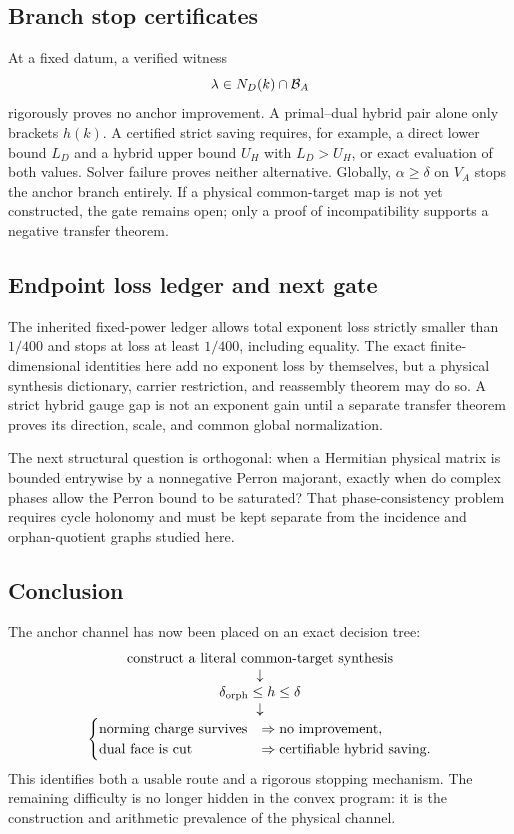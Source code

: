 \subsection*{Branch stop certificates}

At a fixed datum, a verified witness
\[
 \lambda\in N_D(k)\cap\mathcal B_A
\]
rigorously proves no anchor improvement.  A primal--dual hybrid pair
alone only brackets \(h(k)\).  A certified strict saving requires, for
example, a direct lower bound \(L_D\) and a hybrid upper bound \(U_H\)
with \(L_D>U_H\), or exact evaluation of both values.  Solver failure
proves neither alternative.  Globally, \(\alpha\ge\delta\) on \(V_A\)
stops the anchor branch entirely.  If a physical common-target map is
not yet constructed, the gate remains open; only a proof of
incompatibility supports a negative transfer theorem.

\subsection*{Endpoint loss ledger and next gate}

The inherited fixed-power ledger allows total exponent loss strictly
smaller than \(1/400\) and stops at loss at least \(1/400\), including
equality.  The exact finite-dimensional identities here add no exponent
loss by themselves, but a physical synthesis dictionary, carrier
restriction, and reassembly theorem may do so.  A strict hybrid gauge
gap is not an exponent gain until a separate transfer theorem proves
its direction, scale, and common global normalization.

The next structural question is orthogonal: when a Hermitian physical
matrix is bounded entrywise by a nonnegative Perron majorant, exactly
when do complex phases allow the Perron bound to be saturated?  That
phase-consistency problem requires cycle holonomy and must be kept
separate from the incidence and orphan-quotient graphs studied here.

\subsection*{Conclusion}

The anchor channel has now been placed on an exact decision tree:
\[
\begin{array}{c}
\text{construct a literal common-target synthesis}\\
\downarrow\\
\delta_{\rm orph}\le h\le\delta\\
\downarrow\\
\begin{cases}
\text{norming charge survives} &\Rightarrow \text{no improvement},\\
\text{dual face is cut} &\Rightarrow \text{certifiable hybrid saving}.
\end{cases}
\end{array}
\]
This identifies both a usable route and a rigorous stopping mechanism.
The remaining difficulty is no longer hidden in the convex program: it
is the construction and arithmetic prevalence of the physical channel.
